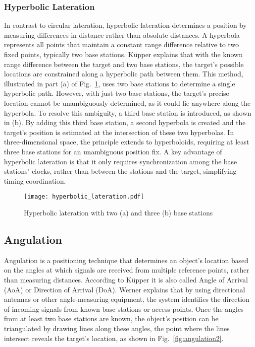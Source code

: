 \subsubsection{Hyperbolic Lateration}
In contrast to circular lateration, hyperbolic lateration determines a position by measuring differences in distance rather than absolute distances. A hyperbola represents all points that maintain a constant range difference relative to two fixed points, typically two base stations. K\"upper \cite{kupper2005location} explains that with the known range difference between the target and two base stations, the target's possible locations are constrained along a hyperbolic path between them. This method, illustrated in part (a) of Fig.~\ref{fig:hyperbolic_lateration}, uses two base stations to determine a single hyperbolic path. However, with just two base stations, the target's precise location cannot be unambiguously determined, as it could lie anywhere along the hyperbola.
To resolve this ambiguity, a third base station is introduced, as shown in (b). By adding this third base station, a second hyperbola is created and the target's position is estimated at the intersection of these two hyperbolas. In three-dimensional space, the principle extends to hyperboloids, requiring at least three base stations for an unambiguous position fix. A key advantage of hyperbolic lateration is that it only requires synchronization among the base stations' clocks, rather than between the stations and the target, simplifying timing coordination.

\begin{figure}[htbp]
    \centering
    \texttt{[image: hyperbolic\_lateration.pdf]}
    \caption{Hyperbolic lateration with two (a) and three (b) base stations \cite{kupper2005location}}
    \label{fig:hyperbolic_lateration}
\end{figure}


\subsection{Angulation}
Angulation is a positioning technique that determines an object's location based on the angles at which signals are received from multiple reference points, rather than measuring distances. According to K\"upper \cite{kupper2005location} it is also called Angle of Arrival (AoA) or Direction of Arrival (DoA). Werner \cite{werner2014indoor} explains that by using directional antennas or other angle-measuring equipment, the system identifies the direction of incoming signals from known base stations or access points. Once the angles from at least two base stations are known, the object's position can be triangulated by drawing lines along these angles, the point where the lines intersect reveals the target's location, as shown in Fig.~\ref{fig:angulation2}.

